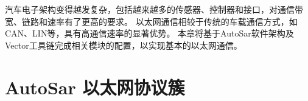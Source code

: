 汽车电子架构变得越发复杂，包括越来越多的传感器、控制器和接口，对通信带宽、链路和速率有了更高的要求。
以太网通信相较于传统的车载通信方式，如CAN、LIN等，具有高通信速率的显著优势。
本章将基于AutoSar软件架构及Vector工具链完成相关模块的配置，以实现基本的以太网通信。

\section{AutoSar 以太网协议簇}

